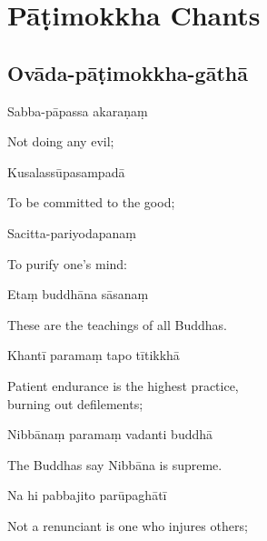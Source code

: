 \chapter{Pāṭimokkha Chants}

\section{Ovāda-pāṭimokkha-gāthā}


\begin{leader}
\end{leader}


Sabba-pāpassa akaraṇaṃ

\begin{cprenglish}
  Not doing any evil;
\end{cprenglish}

Kusalassūpasampadā

\begin{cprenglish}
  To be committed to the good;
\end{cprenglish}

Sacitta-pariyodapanaṃ

\begin{cprenglish}
  To purify one's mind:
\end{cprenglish}

Etaṃ buddhāna sāsanaṃ

\begin{cprenglish}
  These are the teachings of all Buddhas.
\end{cprenglish}

Khantī paramaṃ tapo tītikkhā

\begin{cprenglish}
  Patient endurance is the highest practice,\\
  burning out defilements;\\
\end{cprenglish}

Nibbānaṃ paramaṃ vadanti buddhā

\begin{cprenglish}
  The Buddhas say Nibbāna is supreme.
\end{cprenglish}

Na hi pabbajito parūpaghātī

\begin{cprenglish}
  Not a renunciant is one who injures others;
\end{cprenglish}

